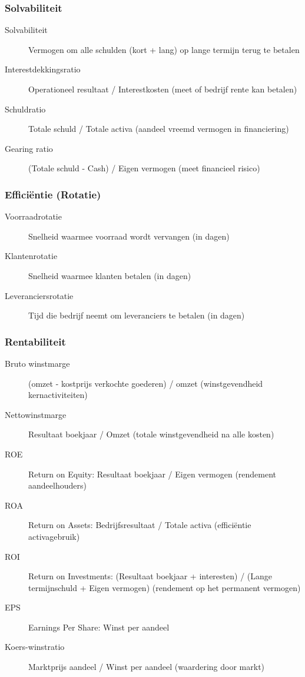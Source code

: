 \documentclass[a4paper,11pt]{article}
\begin{document}
\subsubsection{Solvabiliteit}
\begin{description}
    \item[Solvabiliteit] Vermogen om alle schulden (kort + lang) op lange termijn terug te betalen
    \item[Interestdekkingsratio] Operationeel resultaat / Interestkosten (meet of bedrijf rente kan betalen)
    \item[Schuldratio] Totale schuld / Totale activa (aandeel vreemd vermogen in financiering)
    \item[Gearing ratio] (Totale schuld - Cash) / Eigen vermogen (meet financieel risico)
\end{description}

\subsubsection{Efficiëntie (Rotatie)}
\begin{description}
    \item[Voorraadrotatie] Snelheid waarmee voorraad wordt vervangen (in dagen)
    \item[Klantenrotatie] Snelheid waarmee klanten betalen (in dagen)
    \item[Leveranciersrotatie] Tijd die bedrijf neemt om leveranciers te betalen (in dagen)
\end{description}

\subsubsection{Rentabiliteit}
\begin{description}
    \item[Bruto winstmarge] (omzet - kostprijs verkochte goederen) / omzet (winstgevendheid kernactiviteiten)
    \item[Nettowinstmarge] Resultaat boekjaar / Omzet (totale winstgevendheid na alle kosten)
    \item[ROE] Return on Equity: Resultaat boekjaar / Eigen vermogen (rendement aandeelhouders)
    \item[ROA] Return on Assets: Bedrijfsresultaat / Totale activa (efficiëntie activagebruik)
    \item[ROI] Return on Investments: (Resultaat boekjaar + interesten) / (Lange termijnschuld + Eigen vermogen) (rendement op het permanent vermogen)
    \item[EPS] Earnings Per Share: Winst per aandeel
    \item[Koers-winstratio] Marktprijs aandeel / Winst per aandeel (waardering door markt)
\end{description}
\end{document}

